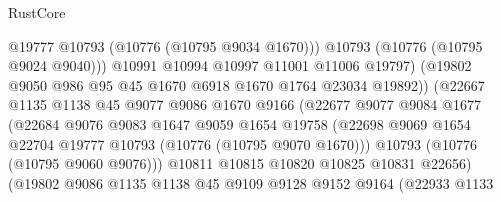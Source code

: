 \begin{lexlean}{RustCore}
\begin{coremodule}
                                        @19777
                                        @10793
                                        (@10776 (@10795 @9034 @1670)))
                                      @10793
                                      (@10776 (@10795 @9024 @9040)))
                                    @10991
                                    @10994
                                    @10997
                                    @11001
                                    @11006
                                    @19797)
                                  (@19802 @9050 @986 @95 @45 @1670 @6918 @1670 @1764 @23034 @19892))
                                (@22667
                                  @1135
                                  @1138
                                  @45
                                  @9077
                                  @9086
                                  @1670
                                  @9166
                                  (@22677
                                    @9077
                                    @9084
                                    @1677
                                    (@22684
                                      @9076
                                      @9083
                                      @1647
                                      @9059
                                      @1654
                                      @19758
                                      (@22698
                                        @9069
                                        @1654
                                        @22704
                                        @19777
                                        @10793
                                        (@10776 (@10795 @9070 @1670)))
                                      @10793
                                      (@10776 (@10795 @9060 @9076)))
                                    @10811
                                    @10815
                                    @10820
                                    @10825
                                    @10831
                                    @22656)
                                  (@19802
                                    @9086
                                    @1135
                                    @1138
                                    @45
                                    @9109
                                    @9128
                                    @9152
                                    @9164
                                    (@22933
                                      @1133

\end{coremodule}
\end{lexlean}
